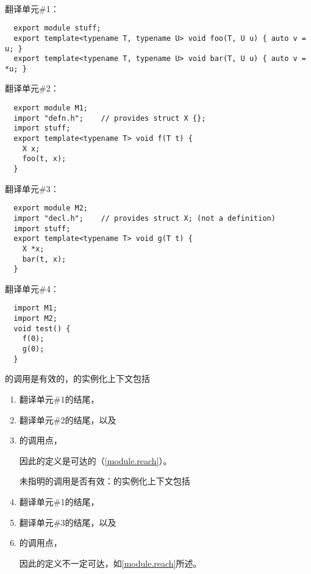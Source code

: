 \paragraph{} %
\begin{example}

  翻译单元\#1：
  \begin{lstlisting}
  export module stuff;
  export template<typename T, typename U> void foo(T, U u) { auto v = u; }
  export template<typename T, typename U> void bar(T, U u) { auto v = *u; }
  \end{lstlisting}
  翻译单元\#2：
  \begin{lstlisting}
  export module M1;
  import "defn.h";    // provides struct X {};
  import stuff;
  export template<typename T> void f(T t) {
    X x;
    foo(t, x);
  }
  \end{lstlisting}
  翻译单元\#3：
  \begin{lstlisting}
  export module M2;
  import "decl.h";    // provides struct X; (not a definition)
  import stuff;
  export template<typename T> void g(T t) {
    X *x;
    bar(t, x);
  }
  \end{lstlisting}
  翻译单元\#4：
  \begin{lstlisting}
  import M1;
  import M2;
  void test() {
    f(0);
    g(0);
  }
  \end{lstlisting}
  的调用是有效的，的实例化上下文包括
  \begin{enumerate}
    \item 翻译单元\#1的结尾，
    \item 翻译单元\#2的结尾，以及
    \item {}的调用点，

      因此的定义是可达的（\ref{module.reach}）。

      未指明的调用是否有效：的实例化上下文包括
    \item 翻译单元\#1的结尾，
    \item 翻译单元\#3的结尾，以及
    \item {}的调用点，

      因此的定义不一定可达，如\ref{module.reach}所述。
  \end{enumerate}
\end{example}
